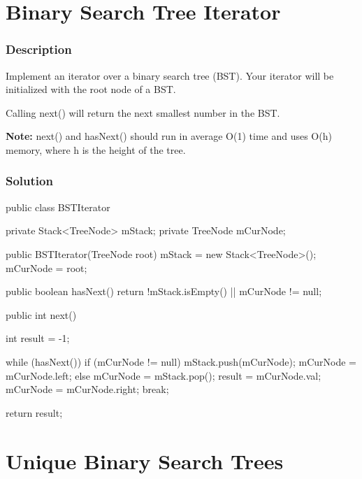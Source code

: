\newpage

\section{Binary Search Tree Iterator} %

\subsubsection{Description}

Implement an iterator over a binary search tree (BST). Your iterator will be initialized with the root node of a BST.

Calling next() will return the next smallest number in the BST.

\textbf{Note:} next() and hasNext() should run in average O(1) time and uses O(h) memory, where h is the height of the tree.

\subsubsection{Solution}

\begin{Code}
public class BSTIterator {

    private Stack<TreeNode> mStack;
    private TreeNode mCurNode;

    public BSTIterator(TreeNode root) {
        mStack = new Stack<TreeNode>();
        mCurNode = root;
    }

    public boolean hasNext() {
        return !mStack.isEmpty() || mCurNode != null;
    }

    public int next() {
        int result = -1;

        while (hasNext()) {
            if (mCurNode != null) {
                mStack.push(mCurNode);
                mCurNode = mCurNode.left;
            } else {
                mCurNode = mStack.pop();
                result = mCurNode.val;
                mCurNode = mCurNode.right;
                break;
            }
        }

        return result;
    }
}
\end{Code}

\newpage

\section{Unique Binary Search Trees} %

